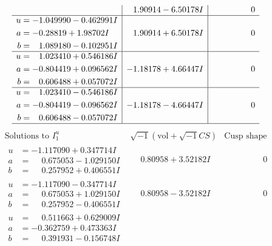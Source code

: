 \documentclass[1p]{elsarticle_modified}
\theoremstyle{definition}
\newcommand{\I}{\sqrt{-1}}
\begin{document}
$$\begin{array}{c|c|c}
 & \phantom{-}1.90914 - 6.50178 I & \phantom{-0.000000 } 0 \\ \hline\begin{aligned}
u &= -1.049990 - 0.462991 I \\
a &= -0.28819 + 1.98702 I \\
b &= \phantom{-}1.089180 - 0.102951 I\end{aligned}
 & \phantom{-}1.90914 + 6.50178 I & \phantom{-0.000000 } 0 \\ \hline\begin{aligned}
u &= \phantom{-}1.023410 + 0.546186 I \\
a &= -0.804419 + 0.096562 I \\
b &= \phantom{-}0.606488 + 0.057072 I\end{aligned}
 & -1.18178 + 4.66447 I & \phantom{-0.000000 } 0 \\ \hline\begin{aligned}
u &= \phantom{-}1.023410 - 0.546186 I \\
a &= -0.804419 - 0.096562 I \\
b &= \phantom{-}0.606488 - 0.057072 I\end{aligned}
 & -1.18178 - 4.66447 I & \phantom{-0.000000 } 0\\
 \hline 
 \end{array}$$\newpage$$\begin{array}{c|c|c}  
\text{Solutions to }I^u_{1}& \I (\text{vol} + \sqrt{-1}CS) & \text{Cusp shape}\\
 \hline 
\begin{aligned}
u &= -1.117090 + 0.347714 I \\
a &= \phantom{-}0.675053 - 1.029150 I \\
b &= \phantom{-}0.257952 + 0.406551 I\end{aligned}
 & \phantom{-}0.80958 + 3.52182 I & \phantom{-0.000000 } 0 \\ \hline\begin{aligned}
u &= -1.117090 - 0.347714 I \\
a &= \phantom{-}0.675053 + 1.029150 I \\
b &= \phantom{-}0.257952 - 0.406551 I\end{aligned}
 & \phantom{-}0.80958 - 3.52182 I & \phantom{-0.000000 } 0 \\ \hline\begin{aligned}
u &= \phantom{-}0.511663 + 0.629009 I \\
a &= -0.362759 + 0.473363 I \\
b &= \phantom{-}0.391931 - 0.156748 I\end{aligned}

\end{array}$$
\end{document}
